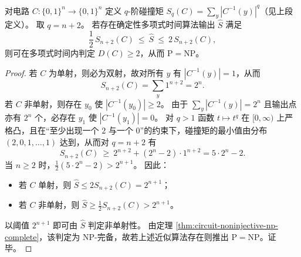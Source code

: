 \begin{theorem}\label{thm:circuit-collision-moment-two-approx-nplus2}
对电路 \(C:\{0,1\}^n\to\{0,1\}^n\) 定义 \(q\)-阶碰撞矩
\(
S_q(C)=\sum_y |C^{-1}(y)|^q
\)（见上段定义）。
取 \(q=n+2\)。
若存在确定性多项式时间算法输出 \(\widehat S\) 满足
\[
\frac12\,S_{n+2}(C)\ \le\ \widehat S\ \le\ 2\,S_{n+2}(C),
\]
则可在多项式时间内判定 \(D(C)\ge 2\)，从而 \(\mathrm{P}=\mathrm{NP}\)。
\end{theorem}
\begin{proof}
若 \(C\) 为单射，则必为双射，故对所有 \(y\) 有 \(|C^{-1}(y)|=1\)，从而
\[
S_{n+2}(C)=\sum_{y}1^{n+2}=2^n.
\]
若 \(C\) 非单射，则存在 \(y_0\) 使 \(|C^{-1}(y_0)|\ge 2\)。
由于 \(\sum_y |C^{-1}(y)|=2^n\) 且输出点亦有 \(2^n\) 个，必存在 \(y_1\) 使 \(|C^{-1}(y_1)|=0\)。
对 \(q>1\) 函数 \(t\mapsto t^q\) 在 \([0,\infty)\) 上严格凸，且在“至少出现一个 \(2\) 与一个 \(0\)”的约束下，碰撞矩的最小值由分布
\(
(2,0,1,\dots,1)
\)
达到，从而对 \(q=n+2\) 有
\[
S_{n+2}(C)\ \ge\ 2^{n+2}+(2^n-2)\cdot 1^{n+2}
=5\cdot 2^n-2.
\]
当 \(n\ge 2\) 时，\(\frac12(5\cdot 2^n-2)>2^{n+1}\)。
因此：
\begin{itemize}
\item 若 \(C\) 单射，则 \(\widehat S\le 2S_{n+2}(C)=2^{n+1}\)；
\item 若 \(C\) 非单射，则 \(\widehat S\ge \frac12 S_{n+2}(C)>2^{n+1}\)。
\end{itemize}
以阈值 \(2^{n+1}\) 即可由 \(\widehat S\) 判定非单射性。
由定理 \ref{thm:circuit-noninjective-np-complete}，该判定为 \(\mathrm{NP}\)-完备，故若上述近似算法存在则推出 \(\mathrm{P}=\mathrm{NP}\)。证毕。
\end{proof}


